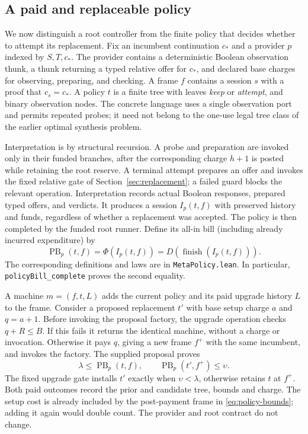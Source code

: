 \documentclass[10pt,letterpaper]{article}
\newcommand{\PB}{\operatorname{PB}}
\newcommand{\finish}{\operatorname{finish}}
\newcommand{\rc}[1]{\texttt{#1}}
\begin{document}
\subsection{A paid and replaceable policy}
We now distinguish a root controller from the finite policy that decides whether to attempt its replacement. Fix an incumbent continuation $c_*$ and a provider $p$ indexed by $S,T,c_*$. The provider contains a deterministic Boolean observation thunk, a thunk returning a typed relative offer for $c_*$, and declared base charges for observing, preparing, and checking. A frame $f$ contains a session $s$ with a proof that $c_s=c_*$. A policy $t$ is a finite tree with leaves \emph{keep} or \emph{attempt}, and binary observation nodes. The concrete language uses a single observation port and permits repeated probes; it need not belong to the one-use legal tree class of the earlier optimal synthesis problem.

Interpretation is by structural recursion. A probe and preparation are invoked only in their funded branches, after the corresponding charge $h+1$ is posted while retaining the root reserve. A terminal attempt prepares an offer and invokes the fixed relative gate of Section~\ref{sec:replacement}; a failed guard blocks the relevant operation. Interpretation records actual Boolean responses, prepared typed offers, and verdicts. It produces a session $I_p(t,f)$ with preserved history and funds, regardless of whether a replacement was accepted. The policy is then completed by the funded root runner. Define its all-in bill (including already incurred expenditure) by
\begin{equation}\label{eq:policy-bill}
 \PB_p(t,f)=\Phi(I_p(t,f))=D(\finish(I_p(t,f))).
\end{equation}
The corresponding definitions and laws are in \rc{MetaPolicy.lean}. In particular, \rc{policyBill\_complete} proves the second equality.

A machine $m=(f,t,L)$ adds the current policy and its paid upgrade history $L$ to the frame. Consider a proposed replacement $t'$ with base setup charge $a$ and $q=a+1$. Before invoking the proposal factory, the upgrade operation checks $q+R\le B$. If this fails it returns the identical machine, without a charge or invocation. Otherwise it pays $q$, giving a new frame $f^+$ with the same incumbent, and invokes the factory. The supplied proposal proves
\begin{equation}\label{eq:policy-bounds}
 \lambda\le\PB_p(t,f),\qquad \PB_p(t',f^+)\le\upsilon.
\end{equation}
The fixed upgrade gate installs $t'$ exactly when $\upsilon<\lambda$, otherwise retains $t$ at $f^+$. Both paid outcomes record the prior and candidate tree, bounds and charge. The setup cost is already included by the post-payment frame in \eqref{eq:policy-bounds}; adding it again would double count. The provider and root contract do not change.
\end{document}
